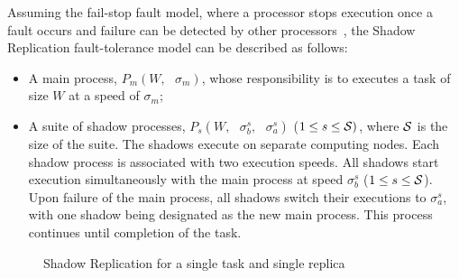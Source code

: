 Assuming the fail-stop fault model, where a processor stops execution once a fault
occurs and failure can be detected by other processors~\cite{gartner_faults_1999,cristian_comm_1991}, 
the Shadow Replication fault-tolerance model can be described as follows:
\begin{itemize}
	\item A main process, $P_m(W,\text{ }\sigma_m)$, whose responsibility is to executes a task of size $W$ at a speed of $\sigma_m$;
	\item A suite of shadow processes, $P_{s}(W,\text{ }\sigma_b^s, \text{ }\sigma_a^s)$ ($1 \le s \le \cal S)$, where $\cal S$ is the size of the suite. The shadows execute on separate computing nodes. Each shadow process is associated with two execution speeds. All shadows start execution simultaneously with the main process at speed $\sigma_b^s$ ($1 \le s \le \cal S$). Upon failure of the main process, all shadows switch their executions to $\sigma_a^s$, with one shadow being designated as the new main process. This process continues until completion of the task.
\end{itemize}

\begin{figure}[!t]
	\begin{center}
	\end{center}
	\caption{Shadow Replication for a single task and single replica}
	\label{fig:sc_overview}
\end{figure}

